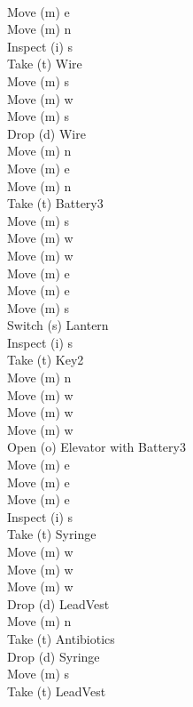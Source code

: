 \documentclass[10.9pt,a4paper]{article}
\begin{document}
\begin{itemize}
\begin{multicols}{3}
          \\Move (m) e
          \\Move (m) n
          \\Inspect (i) s
          \\Take (t) Wire
          \\Move (m) s
          \\Move (m) w
          \\Move (m) s
          \\Drop (d) Wire
          \\Move (m) n
          \\Move (m) e
          \\Move (m) n
          \\Take (t) Battery3
          \\Move (m) s
          \\Move (m) w
          \\Move (m) w
          \\Move (m) e
          \\Move (m) e
          \\Move (m) s
          \\Switch (s) Lantern
          \\Inspect (i) s
          \\Take (t) Key2
          \\Move (m) n
          \\Move (m) w
          \\Move (m) w
          \\Move (m) w
          \\Open (o) Elevator with Battery3
          \\Move (m) e
          \\Move (m) e
          \\Move (m) e
          \\Inspect (i) s
          \\Take (t) Syringe
          \\Move (m) w
          \\Move (m) w
          \\Move (m) w
          \\Drop (d) LeadVest
          \\Move (m) n
          \\Take (t) Antibiotics
          \\Drop (d) Syringe
          \\Move (m) s
          \\Take (t) LeadVest

\end{multicols}
\end{itemize}
\end{document}
